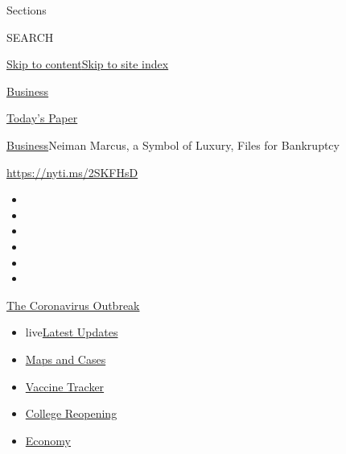 Sections

SEARCH

\protect\hyperlink{site-content}{Skip to
content}\protect\hyperlink{site-index}{Skip to site index}

\href{https://www.nytimes3xbfgragh.onion/section/business}{Business}

\href{https://myaccount.nytimes3xbfgragh.onion/auth/login?response_type=cookie\&client_id=vi}{}

\href{https://www.nytimes3xbfgragh.onion/section/todayspaper}{Today's
Paper}

\href{/section/business}{Business}\textbar{}Neiman Marcus, a Symbol of
Luxury, Files for Bankruptcy

\url{https://nyti.ms/2SKFHsD}

\begin{itemize}
\item
\item
\item
\item
\item
\item
\end{itemize}

\href{https://www.nytimes3xbfgragh.onion/news-event/coronavirus?action=click\&pgtype=Article\&state=default\&region=TOP_BANNER\&context=storylines_menu}{The
Coronavirus Outbreak}

\begin{itemize}
\tightlist
\item
  live\href{https://www.nytimes3xbfgragh.onion/2020/08/03/world/coronavirus-covid-19.html?action=click\&pgtype=Article\&state=default\&region=TOP_BANNER\&context=storylines_menu}{Latest
  Updates}
\item
  \href{https://www.nytimes3xbfgragh.onion/interactive/2020/us/coronavirus-us-cases.html?action=click\&pgtype=Article\&state=default\&region=TOP_BANNER\&context=storylines_menu}{Maps
  and Cases}
\item
  \href{https://www.nytimes3xbfgragh.onion/interactive/2020/science/coronavirus-vaccine-tracker.html?action=click\&pgtype=Article\&state=default\&region=TOP_BANNER\&context=storylines_menu}{Vaccine
  Tracker}
\item
  \href{https://www.nytimes3xbfgragh.onion/2020/08/02/us/covid-college-reopening.html?action=click\&pgtype=Article\&state=default\&region=TOP_BANNER\&context=storylines_menu}{College
  Reopening}
\item
  \href{https://www.nytimes3xbfgragh.onion/live/2020/08/03/business/stock-market-today-coronavirus?action=click\&pgtype=Article\&state=default\&region=TOP_BANNER\&context=storylines_menu}{Economy}
\end{itemize}

